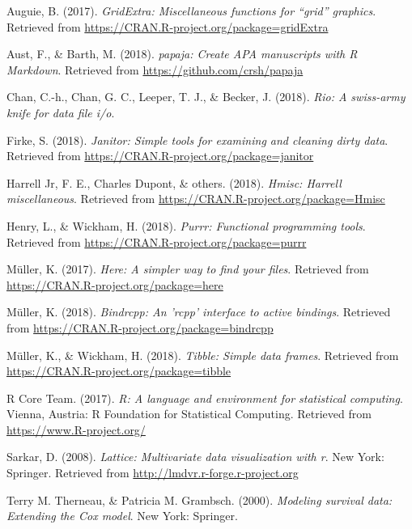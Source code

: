 \documentclass[man]{apa6}
\begin{document}
\begingroup
\setlength{\parindent}{-0.5in} \setlength{\leftskip}{0.5in}

\hypertarget{refs}{}
\hypertarget{ref-R-gridExtra}{}
Auguie, B. (2017). \emph{GridExtra: Miscellaneous functions for ``grid''
graphics}. Retrieved from
\url{https://CRAN.R-project.org/package=gridExtra}

\hypertarget{ref-R-papaja}{}
Aust, F., \& Barth, M. (2018). \emph{papaja: Create APA manuscripts with
R Markdown}. Retrieved from \url{https://github.com/crsh/papaja}

\hypertarget{ref-R-rio}{}
Chan, C.-h., Chan, G. C., Leeper, T. J., \& Becker, J. (2018).
\emph{Rio: A swiss-army knife for data file i/o}.

\hypertarget{ref-R-janitor}{}
Firke, S. (2018). \emph{Janitor: Simple tools for examining and cleaning
dirty data}. Retrieved from
\url{https://CRAN.R-project.org/package=janitor}

\hypertarget{ref-R-Hmisc}{}
Harrell Jr, F. E., Charles Dupont, \& others. (2018). \emph{Hmisc:
Harrell miscellaneous}. Retrieved from
\url{https://CRAN.R-project.org/package=Hmisc}

\hypertarget{ref-R-purrr}{}
Henry, L., \& Wickham, H. (2018). \emph{Purrr: Functional programming
tools}. Retrieved from \url{https://CRAN.R-project.org/package=purrr}

\hypertarget{ref-R-here}{}
Müller, K. (2017). \emph{Here: A simpler way to find your files}.
Retrieved from \url{https://CRAN.R-project.org/package=here}

\hypertarget{ref-R-bindrcpp}{}
Müller, K. (2018). \emph{Bindrcpp: An 'rcpp' interface to active
bindings}. Retrieved from
\url{https://CRAN.R-project.org/package=bindrcpp}

\hypertarget{ref-R-tibble}{}
Müller, K., \& Wickham, H. (2018). \emph{Tibble: Simple data frames}.
Retrieved from \url{https://CRAN.R-project.org/package=tibble}

\hypertarget{ref-R-base}{}
R Core Team. (2017). \emph{R: A language and environment for statistical
computing}. Vienna, Austria: R Foundation for Statistical Computing.
Retrieved from \url{https://www.R-project.org/}

\hypertarget{ref-R-lattice}{}
Sarkar, D. (2008). \emph{Lattice: Multivariate data visualization with
r}. New York: Springer. Retrieved from
\url{http://lmdvr.r-forge.r-project.org}

\hypertarget{ref-R-survival-book}{}
Terry M. Therneau, \& Patricia M. Grambsch. (2000). \emph{Modeling
survival data: Extending the Cox model}. New York: Springer.
\end{document}
